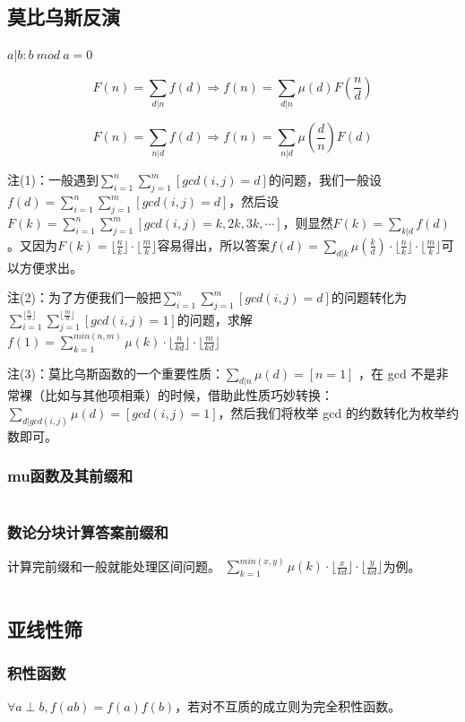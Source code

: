 \documentclass[a4paper,11pt]{article}
\begin{document}
\subsection{莫比乌斯反演}
\(a|b:b\ mod \ a=0\)

\[F(n)=\sum\limits_{d|n}f(d) \Rightarrow f(n)=\sum\limits_{d|n}\mu(d)F(\frac{n}{d})\]

\[F(n)=\sum\limits_{n|d}f(d) \Rightarrow f(n)=\sum\limits_{n|d}\mu(\frac{d}{n})F(d)\]

注(1)：一般遇到\(\sum\limits_{i=1}^{n}\sum\limits_{j=1}^{m}[gcd(i,j)=d]\)的问题，我们一般设\(f(d)=\sum\limits_{i=1}^{n}\sum\limits_{j=1}^{m}[gcd(i,j)=d]\)，然后设\(F(k)=\sum\limits_{i=1}^{n}\sum\limits_{j=1}^{m}[gcd(i,j)=k,2k,3k,\cdots]\)，则显然\(F(k)=\sum\limits_{k|d}f(d)\)。又因为\(F(k)=\lfloor \frac{n}{k}\rfloor \cdot \lfloor \frac{m}{k}\rfloor\)容易得出，所以答案\(f(d)=\sum\limits_{d|k}\mu(\frac{k}{d})\cdot \lfloor \frac{n}{k}\rfloor \cdot \lfloor \frac{m}{k}\rfloor\)可以方便求出。

注(2)：为了方便我们一般把\(\sum\limits_{i=1}^{n}\sum\limits_{j=1}^{m}[gcd(i,j)=d]\)的问题转化为
\(\sum\limits_{i=1}^{\lfloor \frac{n}{d} \rfloor}\sum\limits_{j=1}^{\lfloor \frac{m}{d} \rfloor}[gcd(i,j)=1]\)的问题，求解\(f(1)=\sum\limits_{k=1}^{min(n,m)}\mu(k)\cdot \lfloor \frac{n}{kd}\rfloor \cdot \lfloor \frac{m}{kd}\rfloor\)

注(3)：莫比乌斯函数的一个重要性质：\(\sum\limits_{d|n}{\mu(d)}=[n=1]\)
，在 gcd
不是非常裸（比如与其他项相乘）的时候，借助此性质巧妙转换：\(\sum\limits_{d|gcd(i,j)}{\mu(d)}=[gcd(i,j)=1]\)，然后我们将枚举
gcd 的约数转化为枚举约数即可。

\subsubsection{mu函数及其前缀和}
\inputminted[linenos]{c++}{math/mu.cpp}
\subsubsection{数论分块计算答案前缀和}
计算完前缀和一般就能处理区间问题。
\(\sum\limits_{k=1}^{min(x,y)}\mu(k)\cdot \lfloor \frac{x}{kd}\rfloor \cdot \lfloor \frac{y}{kd}\rfloor\)为例。
\inputminted[linenos]{c++}{math/mobius.cpp}
\subsection{亚线性筛}
\subsubsection{积性函数}
\(\forall a\perp b,f(ab)=f(a)f(b)\)，若对不互质的成立则为完全积性函数。
\end{document}
